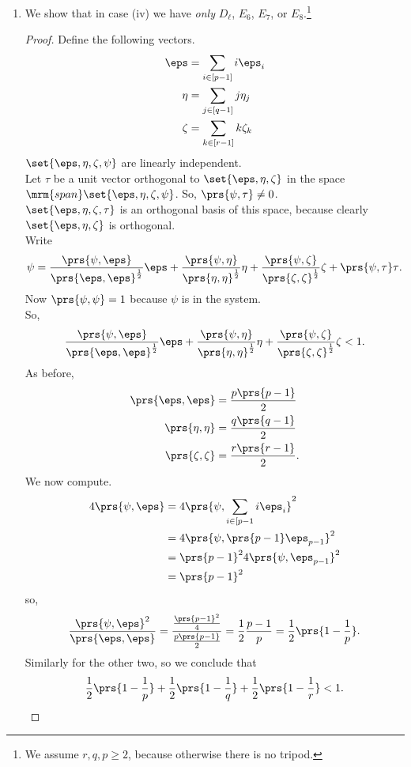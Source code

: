 \documentclass[10pt,a4paper,twoside,openany,hidelinks]{book}
\begin{document}
\begin{enumerate}
\item
We show that in case (iv) we have \emph{only} $D_{\ell}$, $E_6$, $E_7$, or $E_8$.\footnote{We assume $r,q,p \geq 2$, because otherwise there is no tripod.}
\begin{proof}
Define the following vectors.
\begin{align*}
\eps &= \sum_{i \in [p-1]} i \eps_i \\
\eta &= \sum_{j \in [q-1]} j \eta_j \\
\zeta &= \sum_{k \in [r-1]} k \zeta_k
\end{align*}
$\set{\eps,\eta,\zeta,\psi}$ are linearly independent.\\
Let $\tau$ be a unit vector orthogonal to $\set{\eps,\eta,\zeta}$ in the space $\mrm{span}\set{\eps,\eta,\zeta,\psi}$. So, $\prs{\psi,\tau} \neq 0$.\\
$\set{\eps,\eta,\zeta,\tau}$ is an orthogonal basis of this space, because clearly $\set{\eps,\eta,\zeta}$ is orthogonal.\\
Write
\[\psi = \frac{\prs{\psi,\eps}}{\prs{\eps,\eps}^{\frac{1}{2}}}\eps + \frac{\prs{\psi,\eta}}{\prs{\eta,\eta}^{\frac{1}{2}}}\eta + \frac{\prs{\psi,\zeta}}{\prs{\zeta,\zeta}^{\frac{1}{2}}} \zeta + \prs{\psi,\tau} \tau \text{.}\]
Now $\prs{\psi,\psi} = 1$ because $\psi$ is in the system.\\
So,
\[\frac{\prs{\psi,\eps}}{\prs{\eps,\eps}^{\frac{1}{2}}}\eps + \frac{\prs{\psi,\eta}}{\prs{\eta,\eta}^{\frac{1}{2}}}\eta + \frac{\prs{\psi,\zeta}}{\prs{\zeta,\zeta}^{\frac{1}{2}}} \zeta < 1 \text{.}\]
As before,
\begin{align*}
\prs{\eps,\eps} &= \frac{p\prs{p-1}}{2} \\
\prs{\eta,\eta} &= \frac{q\prs{q-1}}{2} \\
\prs{\zeta,\zeta} &= \frac{r\prs{r-1}}{2} \text{.}
\end{align*}
We now compute.
\begin{align*}
4\prs{\psi,\eps} &= 4\prs{\psi, \sum_{i \in [p-1} i \eps_i}^2 \\&=
4\prs{\psi, \prs{p-1} \eps_{p-1}}^2 \\&=
\prs{p-1}^2 4\prs{\psi, \eps_{p-1}}^2 \\&=
\prs{p-1}^2
\end{align*}
so,
\[\frac{\prs{\psi,\eps}^2}{\prs{\eps,\eps}} = \frac{\frac{\prs{p-1}^2}{4}}{\frac{p\prs{p-1}}{2}} = \frac{1}{2} \frac{p-1}{p} = \frac{1}{2} \prs{1 - \frac{1}{p}} \text{.}\]
Similarly for the other two, so we conclude that
\[\frac{1}{2} \prs{1 - \frac{1}{p}} + \frac{1}{2} \prs{1 - \frac{1}{q}} + \frac{1}{2} \prs{1-\frac{1}{r}} < 1\text{.}\]

\end{proof}
\end{enumerate}
\end{document}
